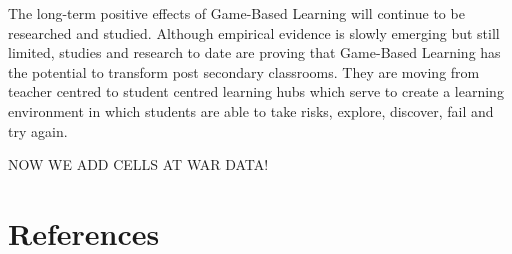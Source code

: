 \documentclass{article}
\begin{document}
The long-term positive effects of Game-Based Learning will continue to be researched and studied. Although empirical evidence is slowly emerging but still limited, studies and research to date are proving that Game-Based Learning has the potential to transform post secondary classrooms. They are moving from teacher centred to student centred learning hubs which serve to create a learning environment in which students are able to take risks, explore, discover, fail and try again.

NOW WE ADD CELLS AT WAR DATA!

\clearpage\newpage
\section{References}


\nocite{*}
\printbibliography[heading=none, sorting=nyt]
\newpage
\end{document}
